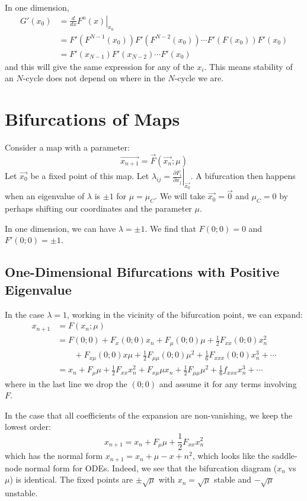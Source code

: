 \documentclass[../Main.tex]{subfiles}
\begin{document}
In one dimension,
\begin{align*}
    G'(x_0) &= \left.\frac{d}{dx} F^n(x)\right|_{x_0} \\
    &= F'(F^{N-1}(x_0)) F'(F^{N-2}(x_0)) \cdots F'(F(x_0)) F'(x_0) \\
    &= F'(x_{N-1}) F'(x_{N-2}) \cdots F'(x_0)
\end{align*}
and this will give the same expression for any of the $x_i$. This means stability of an $N$-cycle does not depend on where in the $N$-cycle we are.
\section{Bifurcations of Maps}
Consider a map with a parameter:
\begin{equation*}
    \vec{x_{n+1}} = \vec{F}(\vec{x_n}; \mu)
\end{equation*}
Let $\vec{x_0}$ be a fixed point of this map. Let $\lambda_{ij} = \left.\frac{\partial F_i}{\partial x_j}\right|_{\vec{x_0}}$. A bifurcation then happens when an eigenvalue of $\lambda$ is $\pm 1$ for $\mu = \mu_C$. We will take $\vec{x_0} = \vec0$ and $\mu_C = 0$ by perhaps shifting our coordinates and the parameter $\mu$.

In one dimension, we can have $\lambda = \pm 1$. We find that $F(0;0) = 0$ and $F'(0;0) = \pm 1$.
\subsection{One-Dimensional Bifurcations with Positive Eigenvalue}
In the case $\lambda = 1$, working in the vicinity of the bifurcation point, we can expand:
\begin{align*}
    x_{n+1} &=F(x_n;\mu) \\
    &= F(0;0) + F_x(0;0)x_n + F_\mu(0;0)\mu + \frac12 F_{xx}(0;0) x_n^2 \\
    &\qquad+ F_{x\mu}(0;0) x\mu + \frac12 F_{\mu\mu}(0;0)\mu^2 + \frac16 F_{xxx}(0;0) x_n^3 + \cdots \\
    &=x_n + F_\mu\mu + \frac12 F_{xx} x_n^2 + F_{x\mu}\mu x_n + \frac12 F_{\mu\mu}\mu^2 + \frac16 f_{xxx}x_n^3 + \cdots
\end{align*}
where in the last line we drop the $(0;0)$ and assume it for any terms involving $F$.

In the case that all coefficients of the expansion are non-vanishing, we keep the lowest order:
\begin{equation*}
    x_{n+1} = x_n + F_\mu \mu + \frac12 F_{xx} x_n^2
\end{equation*}
which has the normal form $x_{n+1} = x_n + \mu - x+n^2$, which looks like the saddle-node normal form for ODEs. Indeed, we see that the bifurcation diagram ($x_n$ vs $\mu$) is identical. The fixed points are $\pm \sqrt{\mu}$ with $x_n = \sqrt{\mu}$ stable and $-\sqrt{\mu}$ unstable.
\end{document}
